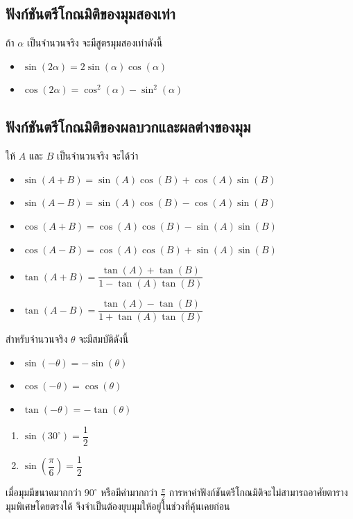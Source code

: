 \subsection{ฟังก์ชันตรีโกณมิติของมุมสองเท่า}
ถ้า $\alpha$ เป็นจำนวนจริง จะมีสูตรมุมสองเท่าดังนี้
\begin{itemize}
\item $\sin(2\alpha)=2\sin(\alpha)\cos(\alpha)$
\item $\cos(2\alpha)=\cos^2(\alpha)-\sin^2(\alpha)$
\end{itemize}

\subsection{ฟังก์ชันตรีโกณมิติของผลบวกและผลต่างของมุม}
ให้ $A$ และ $B$ เป็นจำนวนจริง จะได้ว่า
\begin{itemize}
\item $\sin(A+B)=\sin(A)\cos(B)+\cos(A)\sin(B)$ 
\item $\sin(A-B)=\sin(A)\cos(B)-\cos(A)\sin(B)$ 
\item $\cos(A+B)=\cos(A)\cos(B)-\sin(A)\sin(B)$ 
\item $\cos(A-B)=\cos(A)\cos(B)+\sin(A)\sin(B)$
\item $\tan(A+B)=\dfrac{\tan(A)+\tan(B)}{1-\tan(A)\tan(B)}$  
\item $\tan(A-B)=\dfrac{\tan(A)-\tan(B)}{1+\tan(A)\tan(B)}$ 
\end{itemize}

\begin{remarkbox}\label{remark1.3}
สำหรับจำนวนจริง $\theta$ จะมีสมบัติดังนี้
\begin{itemize}
\item $\sin(-\theta)=-\sin(\theta)$
\item $\cos(-\theta)=\cos(\theta)$
\item $\tan(-\theta)=-\tan(\theta)$
\end{itemize}
\end{remarkbox}

\begin{observationbox}\label{observation1.2}
 \begin{enumerate}
     \item $\sin(30^{\circ})=\dfrac{1}{2}$
     \item $\sin\left(\dfrac{\pi}{6}\right)=\dfrac{1}{2}$
 \end{enumerate}
\end{observationbox}
เมื่อมุมมีขนาดมากกว่า $90^{\circ}$ หรือมีค่ามากกว่า $\frac{\pi}{2}$ การหาค่าฟังก์ชันตรีโกณมิติจะไม่สามารถอาศัยตารางมุมพิเศษโดยตรงได้ จึงจำเป็นต้องยุบมุมให้อยู่ในช่วงที่คุ้นเคยก่อน

